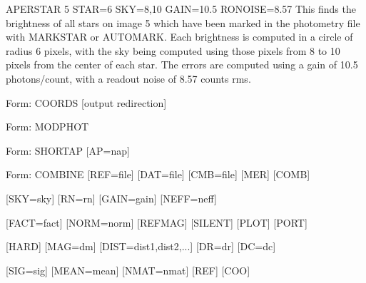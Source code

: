 {\newpage\clearpage
{}%
\begin{example}
  \item[APERSTAR 5 STAR=6 SKY=8,10 GAIN=10.5 RONOISE=8.57\hfill]{
This finds the brightness of all stars on image 5 which
have been marked in the photometry file with MARKSTAR 
or AUTOMARK.  Each brightness is computed in a circle of
radius 6 pixels, with the sky being computed using those
pixels from 8 to 10 pixels from the center of each star.
The errors are computed using a gain of 10.5 photons/count,
with a readout noise of 8.57 counts rms.}
\end{example}%
\lthtmlfigureZ
\lthtmlcheckvsize\clearpage}

{\newpage\clearpage
{}%
\begin{command}
  \item[Form: COORDS {[output redirection]}\hfill]{}
\end{command}%
\lthtmlfigureZ
\lthtmlcheckvsize\clearpage}

{\newpage\clearpage
{}%
\begin{command}
  \item[Form: MODPHOT\hfill]{}
\end{command}%
\lthtmlfigureZ
\lthtmlcheckvsize\clearpage}

{\newpage\clearpage
{}%
\begin{command}
  \item[Form: SHORTAP {[AP=nap]}\hfill]{}
\end{command}%
\lthtmlfigureZ
\lthtmlcheckvsize\clearpage}

{\newpage\clearpage
{}%
\begin{command}
  \item[Form: COMBINE {[REF=file]} {[DAT=file]} {[CMB=file]} {[MER]} {[COMB]}\hfill]{}
  \item{{[SKY=sky]} {[RN=rn]} {[GAIN=gain]} {[NEFF=neff]}}
  \item{{[FACT=fact]} {[NORM=norm]} {[REFMAG]} {[SILENT]} {[PLOT]} {[PORT]}}
  \item{{[HARD]} {[MAG=dm]} {[DIST=dist1,dist2,...]} {[DR=dr]} {[DC=dc]}}
  \item{{[SIG=sig]} {[MEAN=mean]} {[NMAT=nmat]} {[REF]} {[COO]}}
\end{command}%
\lthtmlfigureZ
\lthtmlcheckvsize\clearpage}

